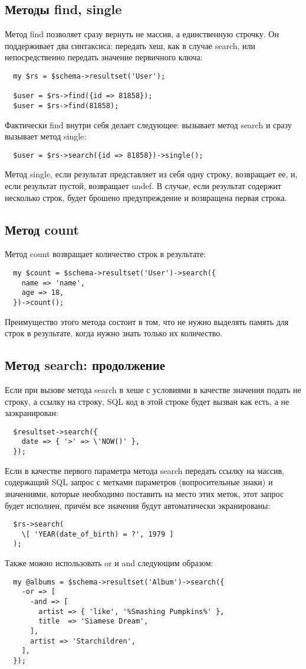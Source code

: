 \subsection{Методы find, single}
Метод find позволяет сразу вернуть не массив, а единственную строчку. Он поддерживает два синтаксиса: передать хеш, как в случае search, или непосредственно передать значение первичного ключа:
\begin{verbatim}
  my $rs = $schema->resultset('User');

  $user = $rs->find({id => 81858});
  $user = $rs->find(81858);
\end{verbatim}
Фактически find внутри себя делает следующее: вызывает метод search и сразу вызывает метод single:
\begin{verbatim}
  $user = $rs->search({id => 81858})->single();
\end{verbatim}
Метод single, если результат представляет из себя одну строку, возвращает ее, и, если результат пустой, возвращает undef. В случае, если результат содержит несколько строк, будет брошено предупреждение и возвращена первая строка.

\subsection{Метод count}
Метод count возвращает количество строк в результате:
\begin{verbatim}
  my $count = $schema->resultset('User')->search({
    name => 'name',
    age => 18,
  })->count();
\end{verbatim}
Преимущество этого метода состоит в том, что не нужно выделять память для строк в результате, когда нужно знать только их количество.


\subsection{Метод search: продолжение}
Если при вызове метода search в хеше с условиями в качестве значения подать не строку, а ссылку на строку, SQL код в этой строке будет вызван как есть, а не заэкранирован:
\begin{verbatim}
  $resultset->search({
    date => { '>' => \'NOW()' },
  });
\end{verbatim}
Если в качестве первого параметра метода search передать ссылку на массив, содержащий SQL запрос с метками параметров (вопросительные знаки) и значениями, которые необходимо поставить на место этих меток, этот запрос будет исполнен, причём все значения будут автоматически экранированы:
\begin{verbatim}
  $rs->search(
    \[ 'YEAR(date_of_birth) = ?', 1979 ]
  );
\end{verbatim}
Также можно использовать or и and следующим образом:
\begin{verbatim}
  my @albums = $schema->resultset('Album')->search({
    -or => [
      -and => [
        artist => { 'like', '%Smashing Pumpkins%' },
        title  => 'Siamese Dream',
      ],
      artist => 'Starchildren',
    ],
  });
\end{verbatim}

